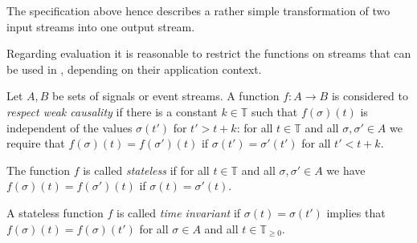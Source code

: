 The specification above hence describes a rather simple transformation of two input streams into one output stream.

Regarding evaluation it is reasonable to restrict the functions on streams that can be used in \tessla, depending on their application context.

\begin{definition}
Let $A,B$ be sets of signals or event streams.
A function $f: A → B$ is considered to \emph{respect weak causality} if there is a constant $k∈𝕋$ such that $f(σ)(t)$ is independent of the values $σ(t')$ for $t'>t+k$:
for all $t∈𝕋$ and all $σ,σ'∈A$ we require that $f(σ)(t) = f(σ')(t)$ if $σ(t')=σ'(t')$ for all $t'<t+k$.

The function $f$ is called \emph{stateless} if for all $t∈𝕋$ and all $σ,σ'∈A$ we have $f(σ)(t) = f(σ')(t)$ if $σ(t) = σ'(t)$.

A stateless function $f$ is called \emph{time invariant} if $σ(t) = σ(t')$ implies that $f(σ)(t) = f(σ)(t')$ for all $σ∈A$ and all $t∈𝕋_{≥0}$.
\end{definition}



